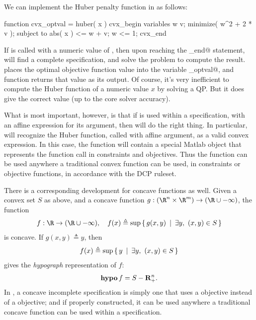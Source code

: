 \documentclass[12pt]{article}
\begin{document}
We can implement the Huber penalty function in \cvx as follows:
\begin{code}
	function cvx_optval = huber( x )
	cvx_begin
	    variables w v;
	    minimize( w^2 + 2 * v );
	    subject to
	        abs( x ) <= w + v;
	        w <= 1;
	cvx_end
\end{code}
If \verb@huber@ is called with a numeric value of \verb@x@, then
upon reaching the \verb@cvx_end@ statement, \cvx will find a complete
specification, and solve the problem to compute the result.
\cvx places the optimal objective function value
into the variable \verb@cvx_optval@, and
function returns that value as its output.
Of course, it's very inefficient to compute the Huber function of a 
numeric value $x$ by solving a QP.  But it does give the correct value
(up to the core solver accuracy).

What is most important, however, is that if \verb@huber@
is used within a \cvx specification, with an affine \cvx expression
for its argument, then \cvx will do the right thing.
In particular, \cvx will recognize the Huber function, called with 
affine argument, as a valid convex expression.
In this case, the function \verb@huber@ will contain a special Matlab 
object that represents the function call in constraints and objectives.
Thus the function \verb@huber@ can be used anywhere a traditional convex
function can be used, in constraints or objective functions,
in accordance with the DCP ruleset.

There is a corresponding development for concave functions as well.
Given a convex set
$S$ as above, and a concave function
$g:(\R^n\times\R^m)\rightarrow(\R\cup-\infty)$,
the function
\begin{equation}
	\label{eq:partial2}
	f:\R\rightarrow(\R\cup-\infty), \quad f(x) 
\triangleq \sup\Condset{g(x,y)}{\exists y,~(x,y)\in S }
\end{equation}
is concave.
If $g(x,y)\triangleq y$, then
\begin{equation}
	f(x) \triangleq \sup\left\{\,y\,~|~\,\exists y,~(x,y)\in S\,\right\}
\end{equation}
gives the \emph{hypograph} representation of $f$:
\[
\operatorname{\textbf{hypo}} f = S - \mathbf{R}_+^n.
\]
In \cvx, a concave incomplete specification is simply one that
uses a \verb@maximize@ objective instead of a \verb@minimize@ objective;
and if properly constructed, it can be used anywhere a traditional
concave function can be used within a \cvx specification. 
\end{document}
